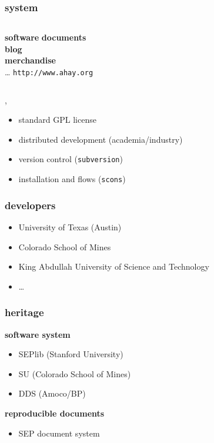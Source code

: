 \begin{frame} \frametitle{\mg system}

  \begin{columns}
    \textbf{software}
    \textbf{documents} \\
    \textbf{blog} \\
    \textbf{merchandise} \\
    \dots  
    \alert{ \texttt{http://www.ahay.org} }
  \end{columns}
  
  \sep
  
  \begin{itemize}
  \item standard GPL license
  \item distributed development (academia/industry)
  \item version control (\texttt{subversion})
  \item installation and flows (\texttt{scons})
  \end{itemize}
  
\end{frame}
\cwpnote{}


\begin{frame} \frametitle{\mg developers}

  \begin{itemize}
  \item University of Texas (Austin)
  \item Colorado School of Mines
  \item King Abdullah University of Science and Technology
  \item \dots
  \end{itemize}
  
\end{frame}
\cwpnote{}


\begin{frame} \frametitle{\mg heritage}

  \textbf{software system}
  \begin{itemize}
  \item SEPlib (Stanford University)
  \item SU (Colorado School of Mines)
  \item DDS (Amoco/BP)
  \end{itemize}
  
  \vfill
  
  \textbf{reproducible documents}
  \begin{itemize}
  \item SEP document system
  \end{itemize}

\end{frame}
\cwpnote{}

